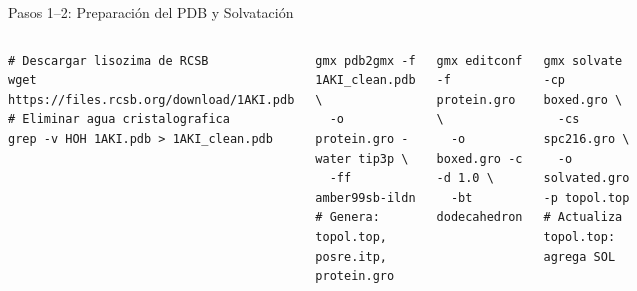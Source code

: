 \documentclass[aspectratio=169, 10pt]{beamer}
\begin{document}
\begin{frame}[fragile]{Pasos 1--2: Preparación del PDB y Solvatación}
\begin{columns}[T]
\begin{tcolorbox}[definitionbox, title={1. Obtener y limpiar PDB}]
\begin{lstlisting}[style=bashstyle]
# Descargar lisozima de RCSB
wget https://files.rcsb.org/download/1AKI.pdb
# Eliminar agua cristalografica
grep -v HOH 1AKI.pdb > 1AKI_clean.pdb
\end{lstlisting}
\end{tcolorbox}
\begin{tcolorbox}[definitionbox, title={2. Generar topologia (FF + agua)}]
\begin{lstlisting}[style=bashstyle]
gmx pdb2gmx -f 1AKI_clean.pdb \
  -o protein.gro -water tip3p \
  -ff amber99sb-ildn
# Genera: topol.top, posre.itp, protein.gro
\end{lstlisting}
\end{tcolorbox}
\begin{tcolorbox}[definitionbox, title={3. Caja dodecaedrica (1 nm margen)}]
\begin{lstlisting}[style=bashstyle]
gmx editconf -f protein.gro \
  -o boxed.gro -c -d 1.0 \
  -bt dodecahedron
\end{lstlisting}
\end{tcolorbox}
\begin{tcolorbox}[definitionbox, title={4. Solvatacion con TIP3P}]
\begin{lstlisting}[style=bashstyle]
gmx solvate -cp boxed.gro \
  -cs spc216.gro \
  -o solvated.gro -p topol.top
# Actualiza topol.top: agrega SOL
\end{lstlisting}
\end{tcolorbox}
\end{columns}
\end{frame}
\end{document}
